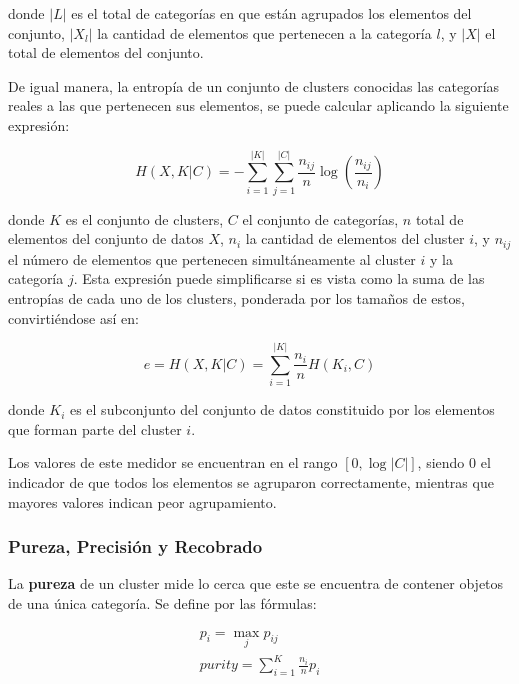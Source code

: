 \noindent
donde $|L|$ es el total de categorías en que están agrupados los elementos del conjunto, $|X_l|$ la cantidad de elementos que pertenecen a la categoría $l$, y $|X|$ el total de elementos del conjunto.

De igual manera, la entropía de un conjunto de clusters conocidas las categorías reales a las que pertenecen sus elementos, se puede calcular aplicando la siguiente expresión:

\begin{equation}
    \label{eq:clustering-entropy-conditional}
    H(X, K|C) = -\sum_{i=1}^{|K|}\sum_{j=1}^{|C|}{\frac{n_{ij}}{n}\log \left( \frac{n_{ij}}{n_i} \right)}
\end{equation}

\noindent
donde $K$ es el conjunto de clusters, $C$ el conjunto de categorías, $n$ total de elementos del conjunto de datos $X$, $n_i$ la cantidad de elementos del cluster $i$, y $n_{ij}$ el número de elementos que pertenecen simultáneamente al cluster $i$ y la categoría $j$.
Esta expresión puede simplificarse si es vista como la suma de las entropías de cada uno de los clusters, ponderada por los tamaños de estos, convirtiéndose así en:

\begin{equation}
    \label{eq:clustering-entropy}
    e = H(X, K|C) = \sum_{i=1}^{|K|}{\frac{n_i}{n}H(K_i,C)}
\end{equation}

\noindent
donde $K_i$ es el subconjunto del conjunto de datos constituido por los elementos que forman parte del cluster $i$.

Los valores de este medidor se encuentran en el rango $[0, \log|C|]$, siendo 0 el indicador de que todos los elementos se agruparon correctamente, mientras que mayores valores indican peor agrupamiento.

\subsubsection{Pureza, Precisión y Recobrado}

La \textbf{pureza} de un cluster mide lo cerca que este se encuentra de contener objetos de una única categoría.
Se define por las fórmulas:

\begin{gather}
    \label{eq:cluster-purity}
    p_i =\max_{j}{p_{ij}} \\
    \label{eq:purity}
    purity = \sum_{i=1}^{K}{\frac{n_i}{n}p_i}
\end{gather}

